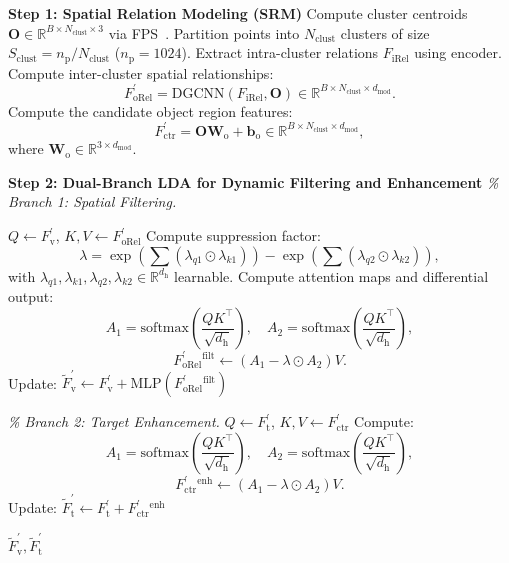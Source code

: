 \documentclass[letterpaper]{article} %
\begin{document}
\begin{algorithm}[H]
	\caption{The Working Process of CLDA.}
	\label{alg:clda}
	\begin{algorithmic}[1]
		\STATE \textbf{Step 1: Spatial Relation Modeling (SRM)}
		\STATE \quad Compute cluster centroids $\mathbf{O} \in \mathbb{R}^{B \times N_{\mathrm{clust}} \times 3}$ via FPS~\cite{qiPointNetDeepHierarchical2017}.
		\STATE \quad Partition points into $N_{\mathrm{clust}}$ clusters of size $S_\mathrm{clust} = n_\mathrm{p}/N_{\mathrm{clust}}$ ($n_\mathrm{p} = 1024$).
		\STATE \quad Extract intra-cluster relations $F_{\mathrm{iRel}}$ using encoder.
		\STATE \quad Compute inter-cluster spatial relationships:
		\[
		F^{\prime}_{\mathrm{oRel}} = \mathrm{DGCNN}(F_{\mathrm{iRel}}, \mathbf{O}) \in \mathbb{R}^{B \times N_{\mathrm{clust}} \times d_{\mathrm{mod}}}.
		\]
		\STATE \quad Compute the candidate object region features:
		\[
		F^{\prime}_{\mathrm{ctr}} = \mathbf{O} \mathbf{W}_\mathrm{o} + \mathbf{b}_\mathrm{o} \in \mathbb{R}^{B \times N_{\mathrm{clust}} \times d_{\mathrm{mod}}},
		\]
		\quad where $\mathbf{W}_\mathrm{o} \in \mathbb{R}^{3 \times d_{\mathrm{mod}}}$.
		
		\STATE \textbf{Step 2: Dual-Branch LDA for Dynamic Filtering and Enhancement}
		\STATE \quad \textit{\% Branch 1: Spatial Filtering.}
		
		\STATE \quad $Q \leftarrow F^{\prime}_{\mathrm{v}}$, \quad $K, V \leftarrow F^{\prime}_{\mathrm{oRel}}$
		\STATE \quad Compute suppression factor:
		\[
		\lambda = \exp\left(\sum (\lambda_{q1} \odot \lambda_{k1})\right) - \exp\left(\sum (\lambda_{q2} \odot \lambda_{k2})\right),
		\]
		\quad with $\lambda_{q1}, \lambda_{k1}, \lambda_{q2}, \lambda_{k2} \in \mathbb{R}^{d_{\mathrm{h}}}$ learnable.
		\STATE \quad Compute attention maps and differential output:
		\[
		A_1 = \mathrm{softmax}\left(\frac{Q K^\intercal}{\sqrt{d_{\mathrm{h}}}}\right), \quad
		A_2 = \mathrm{softmax}\left(\frac{Q K^\intercal}{\sqrt{d_{\mathrm{h}}}}\right),
		\]
		\[
		F^{\prime}_{\mathrm{oRel}}{}^{\text{filt}} \leftarrow (A_1 - \lambda \odot A_2)V.
		\]
		\STATE \quad Update: $\tilde{F}^{\prime}_{\mathrm{v}} \leftarrow F^{\prime}_{\mathrm{v}} + \mathrm{MLP}(F^{\prime}_{\mathrm{oRel}}{}^{\text{filt}})$
		
		\STATE \quad \textit{\% Branch 2: Target Enhancement.}
		\STATE \quad $Q \leftarrow F^{\prime}_{\mathrm{t}}$, \quad $K, V \leftarrow F^{\prime}_{\mathrm{ctr}}$
		\STATE \quad Compute:
		\[
		A_1 = \mathrm{softmax}\left(\frac{Q K^\intercal}{\sqrt{d_{\mathrm{h}}}}\right), \quad
		A_2 = \mathrm{softmax}\left(\frac{Q K^\intercal}{\sqrt{d_{\mathrm{h}}}}\right), 
		\]
		\[
		F^{\prime}_{\mathrm{ctr}}{}^{\text{enh}} \leftarrow (A_1 - \lambda \odot A_2)V.
		\]
		\STATE \quad Update: $\tilde{F}^{\prime}_{\mathrm{t}} \leftarrow F^{\prime}_{\mathrm{t}} + F^{\prime}_{\mathrm{ctr}}{}^{\text{enh}}$
		
		\RETURN $\tilde{F}^{\prime}_{\mathrm{v}}, \tilde{F}^{\prime}_{\mathrm{t}}$
	\end{algorithmic}
\end{algorithm}
\end{document}
